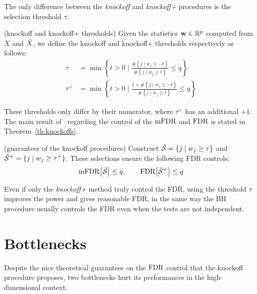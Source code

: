 The only difference between the \emph{knockoff} and \emph{knockoff+} procedures is the selection threshold $\tau$.
\begin{definition}
    (knockoff and knockoff+ thresholds)
    Given the statistics $\mathbf{w} \in \mathbb{R}^p$ computed from $X$ and $\tilde{X}$,
    we define the knockoff and knockoff+ thresholds respectively as follows:
    \begin{align}
        \tau &=
        \min\left\{
            t > 0 \mid \frac
                { \#\left\{ j \mid w_j \leq -t \right\} }
                { \#\left\{ j \mid w_j \geq t \right\} }
            \leq q
        \right\}\label{eq:knock_thres}\\[7pt]
        \tau^+ &=
        \min\left\{
            t > 0 \mid \frac
                { 1 + \#\left\{ j \mid w_j \leq -t \right\} }
                { \#\left\{ j \mid w_j \geq t \right\} }
            \leq q
        \right\}\label{eq:knockp_thres}
    \end{align}
\end{definition}
These thresholds only differ by their numerator, where $\tau^+$ has an additional $+1$.
The main result of~\cite{fixed_x_knockoffs, model_x_knockoffs}
regarding the control of the $\text{mFDR}$ and $\text{FDR}$ is stated in Theorem~\ref{th:knockoffs}.
\begin{theorem}\label{th:knockoffs}
    (guarantees of the knockoff procedures)
    Construct $\hat{\mathcal{S}} = \left\{ j \mid w_j \geq \tau \right\}$
    and $\hat{\mathcal{S}}^+ = \left\{ j \mid w_j \geq \tau^+ \right\}$.
    These selections ensure the following FDR controls:
    \begin{equation}
        \text{mFDR}\big[ \hat{\mathcal{S}} \big] \leq q
        ,\qquad
        \text{FDR}\big[ \hat{\mathcal{S}}^+ \big] \leq q
    \end{equation}
\end{theorem}
Even if only the \textit{knockoff+} method truly control the FDR,
using the threshold $\tau$ improves the power and gives reasonable FDR,
in the same way the BH procedure usually controls the FDR even when the tests are not independent.

\section{Bottlenecks}\label{sec:kb}

Despite the nice theoretical guarantees on the $\text{FDR}$ control that the knockoff procedure proposes,
two bottlenecks hurt its performances in the high-dimensional context.

